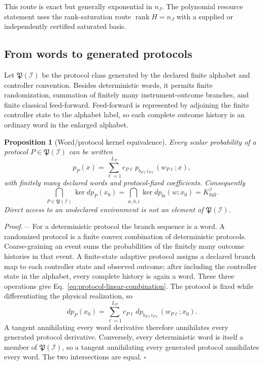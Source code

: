 \documentclass[aps,prl,onecolumn,superscriptaddress,nofootinbib]{revtex4-2}
\newcommand{\rank}{\operatorname{rank}}
\newcommand{\full}{\mathrm{full}}
\newtheorem{proposition}{Proposition}
\begin{document}
This route is exact but generally exponential in $n_J$.  The polynomial resource statement uses the rank-saturation route $\rank H=n_J$ with a supplied or independently certified saturated basis.

\subsection{From words to generated protocols}
\label{sec:words-to-protocols}

Let $\mathfrak P(\mathcal I)$ be the protocol class generated by the declared finite alphabet and controller convention.  Besides deterministic words, it permits finite randomization, summation of finitely many instrument-outcome branches, and finite classical feed-forward.  Feed-forward is represented by adjoining the finite controller state to the alphabet label, so each complete outcome history is an ordinary word in the enlarged alphabet.

\begin{proposition}[Word/protocol kernel equivalence]
\label{prop:word-protocol-kernel}
Every scalar probability of a protocol $P\in\mathfrak P(\mathcal I)$ can be written
\begin{equation}
 p_P(x)=\sum_{\ell=1}^{L_P}c_{P\ell}\,
 p_{b_{P\ell}i_{P\ell}}(w_{P\ell};x),
 \label{eq:protocol-linear-combination}
\end{equation}
with finitely many declared words and protocol-fixed coefficients.  Consequently
\begin{equation}
 \bigcap_{P\in\mathfrak P(\mathcal I)}\ker dp_P(x_0)
 =
 \bigcap_{w,b,i}\ker dp_{bi}(w;x_0)
 =K_{\full}^{\mathcal I}.
 \label{eq:protocol-kernel-equivalence}
\end{equation}
Direct access to an undeclared environment is not an element of $\mathfrak P(\mathcal I)$.
\end{proposition}

\emph{Proof.---}
For a deterministic protocol the branch sequence is a word.  A randomized protocol is a finite convex combination of deterministic protocols.  Coarse-graining an event sums the probabilities of the finitely many outcome histories in that event.  A finite-state adaptive protocol assigns a declared branch map to each controller state and observed outcome; after including the controller state in the alphabet, every complete history is again a word.  These three operations give Eq.~\eqref{eq:protocol-linear-combination}.  The protocol is fixed while differentiating the physical realization, so
\begin{equation}
 dp_P(x_0)=\sum_{\ell=1}^{L_P}c_{P\ell}\,
 dp_{b_{P\ell}i_{P\ell}}(w_{P\ell};x_0).
\end{equation}
A tangent annihilating every word derivative therefore annihilates every generated protocol derivative.  Conversely, every deterministic word is itself a member of $\mathfrak P(\mathcal I)$, so a tangent annihilating every generated protocol annihilates every word.  The two intersections are equal. \hfill$\square$
\end{document}
